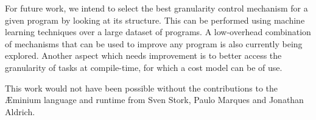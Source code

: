 \documentclass[smallextended]{svjour3}
\begin{document}
For future work, we intend to select the best granularity control mechanism for a given program by looking at its structure. This can be performed using machine learning techniques over a large dataset of programs. A low-overhead combination of mechanisms that can be used to improve any program is also currently being explored. Another aspect which needs improvement is to better access the granularity of tasks at compile-time, for which a cost model can be of use.

\begin{acknowledgements}
This work would not have been possible without the contributions to the Æminium language and runtime from Sven Stork, Paulo Marques and Jonathan Aldrich.
\end{acknowledgements}

      
\end{document}
